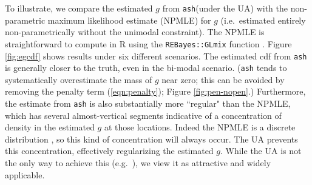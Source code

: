 \documentclass[11pt]{article}
\def\bhat{\hat{\beta}}
\def\mixfdr{{\tt mixfdr}\xspace}
\def\ash{{\tt ash}\xspace}
\begin{document}
To illustrate, we compare the
estimated $g$ from \ash (under the UA) with the non-parametric maximum likelihood estimate (NPMLE) for 
$g$ (i.e.~estimated entirely non-parametrically without the unimodal constraint). 
The NPMLE is straightforward to compute in R using the {\tt REBayes::GLmix} function 
\cite{koenker2014convex}. Figure \ref{fig:egcdf} shows results under six different scenarios.
The estimated cdf from \ash is generally closer to the truth, even in the bi-modal scenario.
(\ash tends to systematically overestimate the mass of $g$ near zero; this can be avoided 
by removing the penalty term (\ref{eqn:penalty}); Figure \ref{fig:pen-nopen}.)
Furthermore, the estimate from \ash is also substantially more ``regular" than the  NPMLE, 
which has several almost-vertical segments indicative of a concentration of density in the estimated $g$ at those locations. 
Indeed the NPMLE is a discrete distribution \cite{koenker2014convex}, so this kind of concentration will always occur. 
The UA prevents this concentration, effectively regularizing the estimated $g$. 
While the UA is not the only way to achieve this (e.g.~\cite{efron2016empirical}), we view it as attractive and widely applicable.

%
\end{document}

